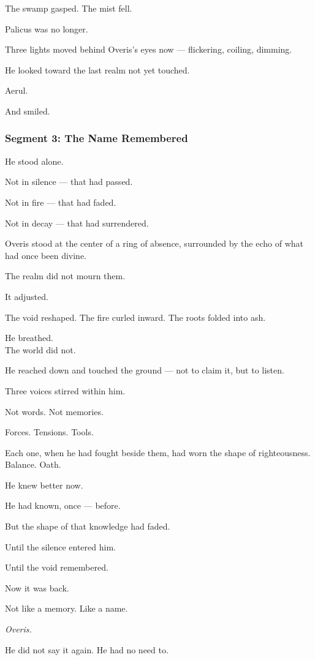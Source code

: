 \documentclass[9pt]{article}
\begin{document}
The swamp gasped. The mist fell.

Palicus was no longer.

Three lights moved behind Overis’s eyes now — flickering, coiling, dimming.

He looked toward the last realm not yet touched.

Aerul.

And smiled.

\newpage

\subsubsection*{Segment 3: The Name Remembered}

He stood alone.

Not in silence — that had passed.

Not in fire — that had faded.

Not in decay — that had surrendered.

Overis stood at the center of a ring of absence, surrounded by the echo of what had once been divine.

The realm did not mourn them.

It adjusted.

The void reshaped. The fire curled inward. The roots folded into ash.

He breathed.\\
The world did not.

He reached down and touched the ground — not to claim it, but to listen.

Three voices stirred within him.

Not words. Not memories.

Forces. Tensions. Tools.

Each one, when he had fought beside them, had worn the shape of righteousness. Balance. Oath.

He knew better now.

He had known, once — before.

But the shape of that knowledge had faded.

Until the silence entered him.

Until the void remembered.

Now it was back.

Not like a memory. Like a name.

\emph{Overis.}

He did not say it again. He had no need to.
\end{document}
